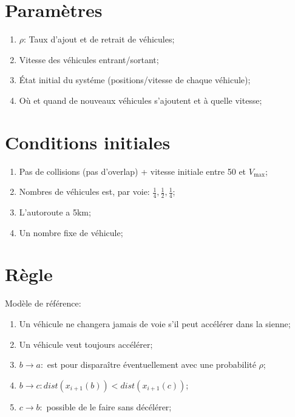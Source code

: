 \documentclass[12pt]{article}
\begin{document}
\section{Param\`etres}
\begin{enumerate}
    \item $\rho$: Taux d'ajout et de retrait de v\'ehicules;
    \item Vitesse des v\'ehicules entrant/sortant;
    \item \'Etat initial du syst\'eme (positions/vitesse de chaque v\'ehicule);
    \item O\`u et quand de nouveaux v\'ehicules s'ajoutent et \`a quelle vitesse;
\end{enumerate}

\section{Conditions initiales}
\begin{enumerate}
    \item Pas de collisions (pas d'overlap) + vitesse initiale entre 50 et $V_{\max}$;
    \item Nombres de v\'ehicules est, par voie: $\frac14,\frac12,\frac14$;
    \item L'autoroute a 5km;
    \item Un nombre fixe de v\'ehicule;
\end{enumerate}

\section{R\`egle}
Mod\`ele de r\'ef\'erence:
\begin{enumerate}
    \item Un v\'ehicule ne changera jamais de voie s'il peut acc\'el\'erer dans la sienne;
    \item Un v\'ehicule veut toujours acc\'el\'erer;
    \item $b\to a\colon$ est pour dispara\^itre \'eventuellement avec une probabilit\'e $\rho$;
    \item $b\to c \colon dist(x_{i+1}(b)) < dist(x_{i+1}(c))$;
    \item $c \to b \colon$ possible de le faire sans d\'ec\'el\'erer;
\end{enumerate}
\end{document}
